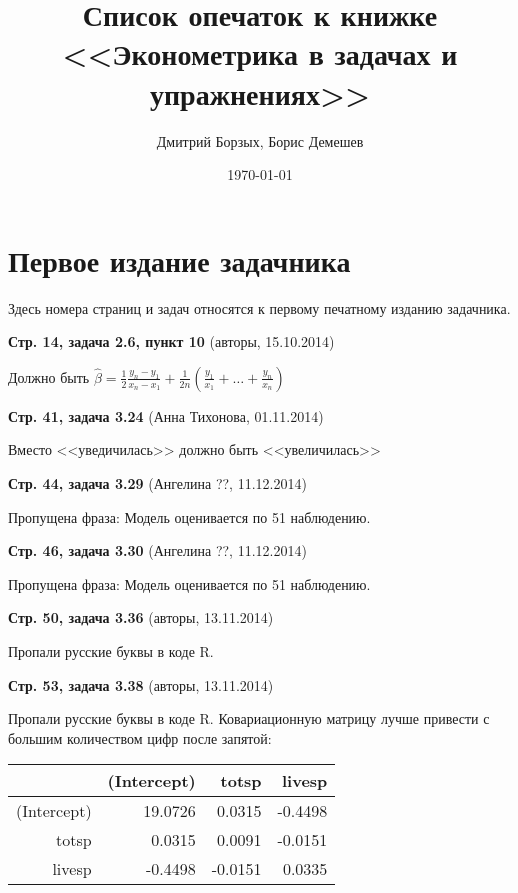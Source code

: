 \documentclass{article}
\date{\today}
\title{Список опечаток к книжке \\
<<Эконометрика в задачах и упражнениях>>}
\author{Дмитрий Борзых, Борис Демешев}
\newcommand{\erroronpage}[4]{\textbf{Стр. #1, #2} (#3, #4)}
\begin{document}
\maketitle

\section{Первое издание задачника}

Здесь номера страниц и задач относятся к первому печатному изданию задачника.




\erroronpage{14}{задача 2.6, пункт 10}{авторы}{15.10.2014}

Должно быть $\hat{\beta} = \frac{1}{2} \frac{y_n - y_1}{x_n - x_1} + \frac{1}{2n}  \left( \frac{y_1}{x_1} + \ldots + \frac{y_n}{x_n} \right) $

\erroronpage{41}{задача 3.24}{Анна Тихонова}{01.11.2014}

Вместо <<уведичилась>> должно быть <<увеличилась>>

\erroronpage{44}{задача 3.29}{Ангелина ??}{11.12.2014}

Пропущена фраза: Модель оценивается по 51 наблюдению.

\erroronpage{46}{задача 3.30}{Ангелина ??}{11.12.2014}

Пропущена фраза: Модель оценивается по 51 наблюдению.

\erroronpage{50}{задача 3.36}{авторы}{13.11.2014}

Пропали русские буквы в коде R.

\erroronpage{53}{задача 3.38}{авторы}{13.11.2014}

Пропали русские буквы в коде R. Ковариационную матрицу лучше привести с большим количеством цифр после запятой:

\begin{table}[ht]
\centering
\begin{tabular}{rrrr}
  \hline
 & (Intercept) & totsp & livesp \\ 
  \hline
(Intercept) & 19.0726 & 0.0315 & -0.4498 \\ 
  totsp & 0.0315 & 0.0091 & -0.0151 \\ 
  livesp & -0.4498 & -0.0151 & 0.0335 \\ 
   \hline
\end{tabular}
\end{table}
\end{document}
